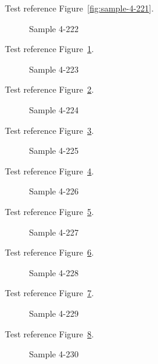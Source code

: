 Test reference Figure~\ref{fig:sample-4-221}.

\begin{figure}[tbhp]
\caption{Sample 4-222}
\label{fig:sample-4-222}
\end{figure}

Test reference Figure~\ref{fig:sample-4-222}.

\begin{figure}[tbhp]
\caption{Sample 4-223}
\label{fig:sample-4-223}
\end{figure}

Test reference Figure~\ref{fig:sample-4-223}.

\begin{figure}[tbhp]
\caption{Sample 4-224}
\label{fig:sample-4-224}
\end{figure}

Test reference Figure~\ref{fig:sample-4-224}.

\begin{figure}[tbhp]
\caption{Sample 4-225}
\label{fig:sample-4-225}
\end{figure}

Test reference Figure~\ref{fig:sample-4-225}.

\begin{figure}[tbhp]
\caption{Sample 4-226}
\label{fig:sample-4-226}
\end{figure}

Test reference Figure~\ref{fig:sample-4-226}.

\begin{figure}[tbhp]
\caption{Sample 4-227}
\label{fig:sample-4-227}
\end{figure}

Test reference Figure~\ref{fig:sample-4-227}.

\begin{figure}[tbhp]
\caption{Sample 4-228}
\label{fig:sample-4-228}
\end{figure}

Test reference Figure~\ref{fig:sample-4-228}.

\begin{figure}[tbhp]
\caption{Sample 4-229}
\label{fig:sample-4-229}
\end{figure}

Test reference Figure~\ref{fig:sample-4-229}.

\begin{figure}[tbhp]
\caption{Sample 4-230}
\label{fig:sample-4-230}
\end{figure}


